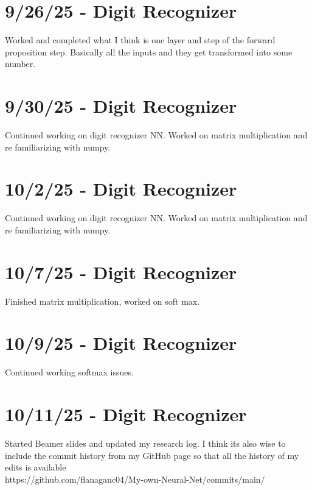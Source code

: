 \documentclass[]{article}
\begin{document}
\section{9/26/25 - Digit Recognizer}
Worked and completed what I think is one layer and step of the forward proposition step. Basically all the inputs and they get transformed into some number.

\section{9/30/25 - Digit Recognizer}
Continued working on digit recognizer NN. Worked on matrix multiplication and re familiarizing with numpy. 

\section{10/2/25 - Digit Recognizer}
Continued working on digit recognizer NN. Worked on matrix multiplication and re familiarizing with numpy. 

\section{10/7/25 - Digit Recognizer}
Finished matrix multiplication, worked on soft max.

\section{10/9/25 - Digit Recognizer}
Continued working softmax issues. 

\section{10/11/25 - Digit Recognizer}
Started Beamer slides and updated my research log. I think its also wise to include the commit history from my GitHub page so that all the history of my edits is available\\
https://github.com/flanaganc04/My-own-Neural-Net/commits/main/
\end{document}
